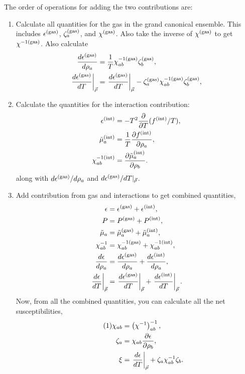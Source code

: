 \documentclass[12pt]{article}
\numberwithin{equation}{section}
\numberwithin{figure}{section}
\newcommand\eqnumber{\addtocounter{equation}{1}\tag{\theequation}}
\begin{document}
The order of operations for adding the two contributions are:
\begin{enumerate}\itemsep=0pt
        \item Calculate all quantities for the gas in the grand canonical ensemble. This includes $\epsilon^{\rm(gas)}$, $\zeta_a^{\rm(gas)}$, and $\chi^{\rm(gas)}$. Also take the inverse of $\chi^{\rm(gas)}$ to get $\chi^{-1{\rm(gas)}}$. Also calculate
        \begin{align*}
        \frac{d\epsilon^{\rm(gas)}}{d\rho_a}&=\frac{1}{T}\chi^{-1{\rm(gas)}}_{ab}\zeta^{\rm(gas)}_b,\\
        \left.\frac{d\epsilon^{\rm(gas)}}{dT}\right|_{\vec{\rho}}&=\left.\frac{d\epsilon^{\rm(gas)}}{dT}\right|_{\vec{\mu}}-\zeta^{\rm(gas)}_a\chi^{-1{\rm(gas)}}_{ab}\zeta^{\rm(gas)}_b,\\
        \end{align*}
        \item Calculate the quantities for the interaction contribution: 
        \begin{align*}
        \epsilon^{\rm(int)}&=-T^2\frac{\partial}{\partial T}(f^{\rm(int)}/T),\\
        \tilde{\mu}_a^{\rm(int)}&=\frac{1}{T}\frac{\partial f^{\rm(int)}}{\partial\rho_a},\\
        \chi^{-1{\rm(int)}}_{ab}&=\frac{\partial\tilde{\mu}^{\rm(int)}_a}{\partial\rho_b}.
        \end{align*}
        along with $d\epsilon^{\rm(gas)}/d\rho_a$ and $d\epsilon^{\rm(gas)}/dT|_{\vec{\rho}}$.
        \item Add contribution from gas and interactions to  get combined quantities,
        \begin{align*}
        \epsilon&=\epsilon^{\rm(gas)}+\epsilon^{\rm(int)},\\
        P&=P^{\rm(gas)}+P^{\rm(int)},\\
        \tilde{\mu}_a&=\tilde{\mu}_a^{\rm(gas)}+\tilde{\mu}_a^{\rm(int)},\\
        \chi^{-1}_{ab}&=\chi^{-1{\rm(gas)}}_{ab}+\chi^{-1{\rm(int)}}_{ab},\\
        \frac{d\epsilon}{d\rho_a}&=\frac{d\epsilon^{\rm(gas)}}{d\rho_a}+\frac{d\epsilon^{\rm(int)}}{d\rho_a},\\
        \left.\frac{d\epsilon}{dT}\right|_{\vec{\rho}}&=\left.\frac{d\epsilon^{\rm(gas)}}{dT}\right|_{\vec{\rho}}
        +\left.\frac{d\epsilon^{\rm(int)}}{dT}\right|_{\vec{\rho}}.
        \end{align*}
        Now, from all the combined quantities, you can calculate all the net susceptibilities,
        \begin{align*}\eqnumber
        \chi_{ab}&=\left(\chi^{-1}\right)^{-1}_{ab},\\
        \zeta_a&=\chi_{ab}\frac{\partial\epsilon}{\partial\rho_b},\\
        \xi&=\left.\frac{d\epsilon}{dT}\right|_{\vec{\rho}}+\zeta_a\chi^{-1}_{ab}\zeta_b.
        \end{align*}
\end{enumerate}
\end{document}
